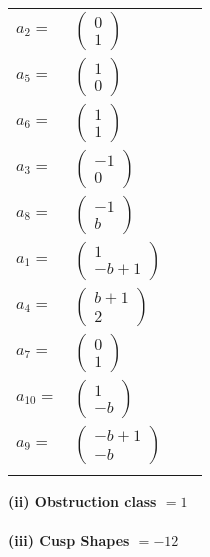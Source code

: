 \documentclass[1p]{elsarticle_modified}
\theoremstyle{definition}
\begin{document}
\begin{tabular}{m{7pt} m{180pt} m{7pt} m{180pt} }
\flushright $a_{2}=$&$\begin{pmatrix}0\\1\end{pmatrix}$ \\
\flushright $a_{5}=$&$\begin{pmatrix}1\\0\end{pmatrix}$ \\
\flushright $a_{6}=$&$\begin{pmatrix}1\\1\end{pmatrix}$ \\
\flushright $a_{3}=$&$\begin{pmatrix}-1\\0\end{pmatrix}$ \\
\flushright $a_{8}=$&$\begin{pmatrix}-1\\b\end{pmatrix}$ \\
\flushright $a_{1}=$&$\begin{pmatrix}1\\- b+1\end{pmatrix}$ \\
\flushright $a_{4}=$&$\begin{pmatrix}b+1\\2\end{pmatrix}$ \\
\flushright $a_{7}=$&$\begin{pmatrix}0\\1\end{pmatrix}$ \\
\flushright $a_{10}=$&$\begin{pmatrix}1\\- b\end{pmatrix}$ \\
\flushright $a_{9}=$&$\begin{pmatrix}- b+1\\- b\end{pmatrix}$\\&\end{tabular}
\flushleft \textbf{(ii) Obstruction class $= 1$}\\~\\
\flushleft \textbf{(iii) Cusp Shapes $= -12$}\\~\\
\end{document}

